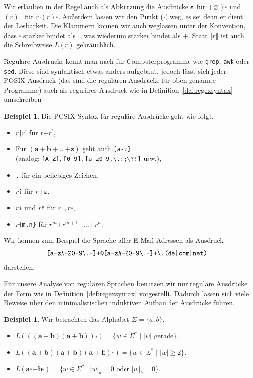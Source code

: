 \documentclass[11pt, a4paper]{article}
\theoremstyle{definition}
\newtheorem{example}[definition]{Beispiel}
\theoremstyle{plain}
\numberwithin{equation}{section}
\let\emptyset\varnothing
\begin{document}
Wir erlauben in der Regel auch als Abkürzung die Ausdrücke \( \bm{\varepsilon} \) für \( (\bm{\emptyset}) \overset{\bm{\ast}}{} \) und \( (r) \overset{\bm{+}}{} \) für \( r \bm{\cdot} (r) \overset{\bm{\ast}}{} \). Außerdem lassen wir den Punkt (\( \bm{\cdot} \)) weg, es sei denn er dient der Lesbarkeit. Die Klammern können wir auch weglassen unter der Konvention, dass \( \overset{\bm{\ast}}{} \) stärker bindet als \( \bm{\cdot} \), was wiederum stärker bindet als \( \bm{+} \). Statt \( \llbracket r \rrbracket \) ist auch die Schreibweise \( L(r) \) gebräuchlich.\par
Reguläre Ausdrücke kennt man auch für Computerprogramme wie \texttt{grep}, \texttt{awk} oder \texttt{sed}. Diese sind syntaktisch etwas anders aufgebaut, jedoch lässt sich jeder POSIX-Ausdruck (das sind die regulären Ausdrücke für oben genannte Programme) auch als regulärer Ausdruck wie in Definition~\ref{def:regexsyntax} umschreiben.
\begin{example}
	Die POSIX-Syntax für reguläre Ausdrücke geht wie folgt.
	\begin{itemize}
		\item \( r \)\verb$|$\( r^\prime \) für \( r \bm{+} r^\prime \),
		\item Für \( (\bm{a + b +} \ldots \bm{+ z}) \) geht auch \verb$[a-z]$\\
			(analog: \verb$[A-Z]$,  \verb$[0-9]$, \verb$[a-z0-9,\.:;\?!]$ usw.),
		\item \verb$.$ für ein beliebiges Zeichen,
		\item \( r \)\verb$?$ für \( r \bm{+ \varepsilon} \),
		\item \( r \)\verb$+$ und \( r \)\verb$*$ für \( r\overset{\bm{+}}{}, r\overset{\bm{\ast}}{} \),
		\item \( r \)\verb${m,n}$ für \( r^m \bm{+} r^{m+1} \bm{+} \ldots \bm{+} r^n \).
	\end{itemize}
	Wir können zum Beispiel die Sprache aller E-Mail-Adressen als Ausdruck
	\[
		\verb$[a-zA-Z0-9\.-]+@[a-zA-Z0-9\.-]+\.(de|com|net)$
	\]
	darstellen.
\end{example}
Für unsere Analyse von regulären Sprachen benutzen wir nur reguläre Ausdrücke der Form wie in Definition~\ref{def:regexsyntax} vorgestellt. Dadurch lassen sich viele Beweise über den minimalistischen induktiven Aufbau der Ausdrücke führen.
\begin{example}
	Wir betrachten das Alphabet \( \Sigma = \{a, b\} \).
	\begin{itemize}
		\item \( L(\bm{((a+b)(a+b))} \overset{\bm{\ast}}{}) = \{ w \in \Sigma^\ast \mid \left| w \right| \text{ gerade} \} \).
		\item \( L(\bm{(a+b)(a+b)(a+b)} \overset{\bm{\ast}}{}) = \{ w \in \Sigma^\ast \mid \left| w \right| \geq 2 \} \).
		\item \( L(\bm{a} \overset{\bm{\ast}}{} \bm{+ b} \overset{\bm{\ast}}{}) = \{ w \in \Sigma^\ast \mid \left| w \right|_a = 0 \text{ oder } \left| w \right|_b = 0 \} \).
	\end{itemize}
\end{example}
\end{document}
